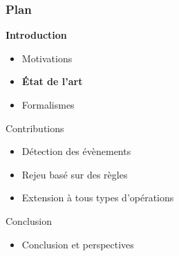 \documentclass[aspectratio=1610]{beamer}
\begin{document}
\begin{frame}
	\frametitle{Plan}
	\centering
	\begin{minipage}{\textwidth}
		\raggedright
		\begin{minipage}{.55\textwidth}
			\begin{mytocblock}{\textbf{Introduction}}
				\begin{itemize}
					\item[] Motivations
					\item[] \textbf{État de l'art}
					\item[] Formalismes
				\end{itemize}
			\end{mytocblock}
		\end{minipage}

		\vspace{1em}

		\begin{minipage}{.55\textwidth}
			\begin{mytocblock}{Contributions}
				\begin{itemize}
					\item[] Détection des évènements
					\item[] Rejeu basé sur des règles
					\item[] Extension à tous types d'opérations
				\end{itemize}
			\end{mytocblock}
		\end{minipage}

		\vspace{1em}

		\begin{minipage}{.55\textwidth}
			\begin{mytocblock}{Conclusion}
				\begin{itemize}
					\item[] Conclusion et perspectives
				\end{itemize}
			\end{mytocblock}
		\end{minipage}
	\end{minipage}
\end{frame}


\end{document}
